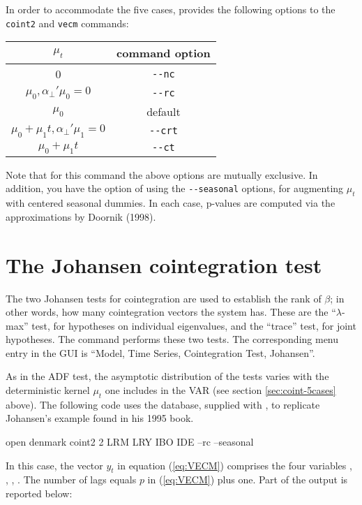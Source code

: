 In order to accommodate the five cases,  provides the
following options to the \texttt{coint2} and \texttt{vecm} commands:
\begin{center}
  \begin{tabular}{cc}
    \hline
    $\mu_t$ & command option \\
    \hline
    0 & \verb|--nc| \\
    $\mu_0, \alpha_{\perp}'\mu_0 = 0 $ &  \verb|--rc| \\
    $\mu_0$ &  default \\
    $\mu_0 + \mu_1 t , \alpha_{\perp}'\mu_1 = 0$ &  \verb|--crt| \\
    $\mu_0 + \mu_1 t$ &  \verb|--ct| \\
    \hline
  \end{tabular}
\end{center}
Note that for this command the above options are mutually exclusive.
In addition, you have the option of using the \verb|--seasonal|
options, for augmenting $\mu_t$ with centered seasonal dummies.  In
each case, p-values are computed via the approximations by Doornik
(1998).

\section{The Johansen cointegration test}
\label{sec:johansen-test}

The two Johansen tests for cointegration are used to establish the rank of
$\beta$; in other words, how many cointegration vectors the system
has.  These are the ``$\lambda$-max'' test, for hypotheses
on individual eigenvalues, and the ``trace'' test, for joint
hypotheses.  The  command  performs these two
tests. The corresponding menu entry in the GUI is ``Model, Time
Series, Cointegration Test, Johansen''.

As in the ADF test, the asymptotic distribution of the tests varies
with the deterministic kernel $\mu_t$ one includes in the VAR (see
section \ref{sec:coint-5cases} above). The following code uses the
 database, supplied with , to replicate
Johansen's example found in his 1995 book.
%
\begin{code}
open denmark
coint2 2 LRM LRY IBO IDE --rc --seasonal
\end{code}
%
In this case, the vector $y_t$ in equation (\ref{eq:VECM})
comprises the four variables , , ,
. The number of lags equals $p$ in (\ref{eq:VECM}) plus
one. Part of the output is reported below:

